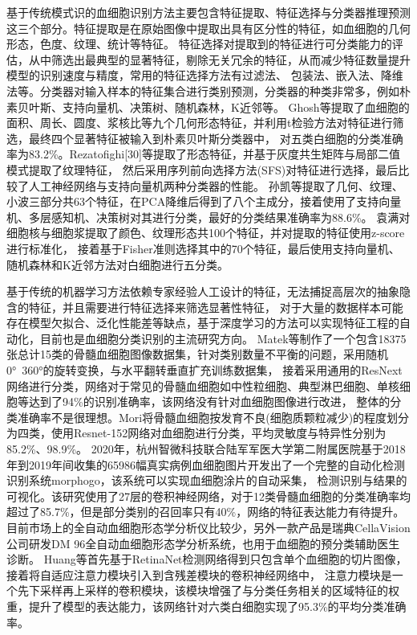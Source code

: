 基于传统模式识\cite{jain2000statistical}的血细胞识别方法主要包含特征提取、特征选择与分类器推理预测这三个部分。特征提取是在原始图像中提取出具有区分性的特征，如血细胞的几何形态，色度、纹理、统计等特征。
特征选择对提取到的特征进行可分类能力的评估，从中筛选出最典型的显著特征，剔除无关冗余的特征，从而减少特征数量提升模型的识别速度与精度，常用的特征选择方法有过滤法、
包装法、嵌入法、降维法等。分类器对输入样本的特征集合进行类别预测，分类器的种类非常多，例如朴素贝叶斯、支持向量机、决策树、随机森林，K近邻等。
Ghosh\cite{ghosh2010statistical}等提取了血细胞的面积、周长、圆度、浆核比等九个几何形态特征，并利用t检验方法对特征进行筛选，最终四个显著特征被输入到朴素贝叶斯分类器中，
对五类白细胞的分类准确率为83.2\%。Rezatofighi[30]等提取了形态特征，并基于灰度共生矩阵与局部二值模式提取了纹理特征，
然后采用序列前向选择方法(SFS)对特征进行选择，最后比较了人工神经网络与支持向量机两种分类器的性能。
孙凯\cite{sunkai2020}等提取了几何、纹理、小波三部分共63个特征，在PCA降维后得到了八个主成分，接着使用了支持向量机、多层感知机、决策树对其进行分类，最好的分类结果准确率为88.6\%。
袁满\cite{yuan2017}对细胞核与细胞浆提取了颜色、纹理形态共100个特征，并对提取的特征使用z-score进行标准化，
接着基于Fisher准则选择其中的70个特征，最后使用支持向量机、随机森林和K近邻方法对白细胞进行五分类。

基于传统的机器学习方法依赖专家经验人工设计的特征，无法捕捉高层次的抽象隐含的特征，并且需要进行特征选择来筛选显著性特征，
对于大量的数据样本可能存在模型欠拟合、泛化性能差等缺点，基于深度学习的方法可以实现特征工程的自动化，目前也是血细胞分类识别的主流研究方向。
Matek\cite{matek2019human}等制作了一个包含18375张总计15类的骨髓血细胞图像数据集，针对类别数量不平衡的问题，采用随机0°~360°的旋转变换，与水平翻转垂直扩充训练数据集，
接着采用通用的ResNext网络进行分类，网络对于常见的骨髓血细胞如中性粒细胞、典型淋巴细胞、单核细胞等达到了94\%的识别准确率，该网络没有针对血细胞图像进行改进，
整体的分类准确率不是很理想。Mori\cite{mori2020assessment}将骨髓血细胞按发育不良(细胞质颗粒减少)的程度划分为四类，使用Resnet-152网络对血细胞进行分类，平均灵敏度与特异性分别为85.2\%、98.9\%。
2020年，杭州智微科技\cite{fu2020morphogo}联合陆军军医大学第二附属医院基于2018年到2019年间收集的65986幅真实病例血细胞图片开发出了一个完整的自动化检测识别系统morphogo，该系统可以实现血细胞涂片的自动采集，
检测识别与结果的可视化。该研究使用了27层的卷积神经网络，对于12类骨髓血细胞的分类准确率均超过了85.7\%，但是部分类别的召回率只有40\%，网络的特征表达能力有待提升。
目前市场上的全自动血细胞形态学分析仪比较少，另外一款产品是瑞典CellaVision公司研发DM 96\cite{yoon2019diagnostic}全自动血细胞形态学分析系统，也用于血细胞的预分类辅助医生诊断。
Huang\cite{huang2020attention}等首先基于RetinaNet检测网络得到只包含单个血细胞的切片图像，接着将自适应注意力模块引入到含残差模块的卷积神经网络中，
注意力模块是一个先下采样再上采样的卷积模块，该模块增强了与分类任务相关的区域特征的权重，提升了模型的表达能力，该网络针对六类白细胞实现了95.3\%的平均分类准确率。

